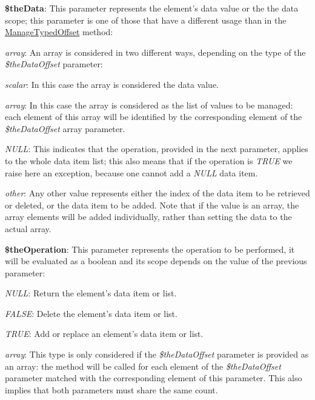 \begin{DoxyItemize}
\item {\bfseries \$the\-Data}\-: This parameter represents the element's data value or the the data scope; this parameter is one of those that have a different usage than in the \hyperlink{class_c_attribute_a200333aed4419e123658883a9e4495e2}{Manage\-Typed\-Offset} method\-: 
\begin{DoxyItemize}
\item {\itshape array}\-: An array is considered in two different ways, depending on the type of the {\itshape \$the\-Data\-Offset} parameter\-: 
\begin{DoxyItemize}
\item {\itshape scalar}\-: In this case the array is considered the data value. 
\item {\itshape array}\-: In this case the array is considered as the list of values to be managed\-: each element of this array will be identified by the corresponding element of the {\itshape \$the\-Data\-Offset} array parameter. 
\end{DoxyItemize}
\item {\itshape N\-U\-L\-L}\-: This indicates that the operation, provided in the next parameter, applies to the whole data item list; this also means that if the operation is {\itshape T\-R\-U\-E} we raise here an exception, because one cannot add a {\itshape N\-U\-L\-L} data item. 
\item {\itshape other}\-: Any other value represents either the index of the data item to be retrieved or deleted, or the data item to be added. Note that if the value is an array, the array elements will be added individually, rather than setting the data to the actual array. 
\end{DoxyItemize}
\item {\bfseries \$the\-Operation}\-: This parameter represents the operation to be performed, it will be evaluated as a boolean and its scope depends on the value of the previous parameter\-: 
\begin{DoxyItemize}
\item {\itshape N\-U\-L\-L}\-: Return the element's data item or list. 
\item {\itshape F\-A\-L\-S\-E}\-: Delete the element's data item or list. 
\item {\itshape T\-R\-U\-E}\-: Add or replace an element's data item or list. 
\item {\itshape array}\-: This type is only considered if the {\itshape \$the\-Data\-Offset} parameter is provided as an array\-: the method will be called for each element of the {\itshape \$the\-Data\-Offset} parameter matched with the corresponding element of this parameter. This also implies that both parameters must share the same count. 

\end{DoxyItemize}
\end{DoxyItemize}
